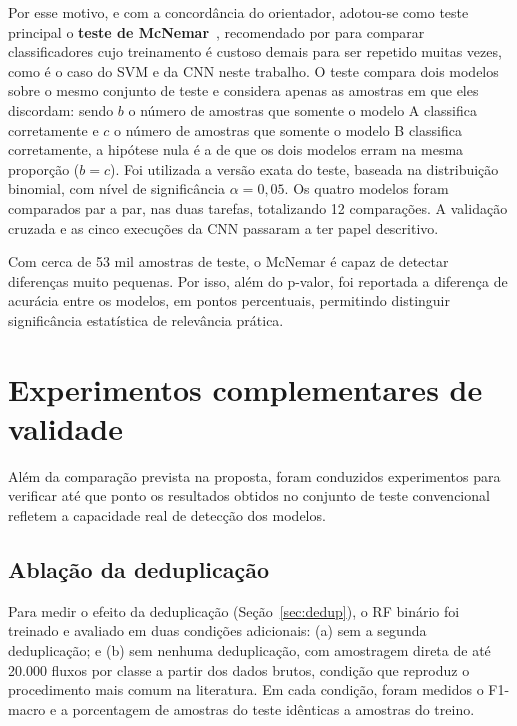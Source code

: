 Por esse motivo, e com a concordância do orientador, adotou-se como teste principal o \textbf{teste de McNemar}~\cite{mcnemar1947}, recomendado por  para comparar classificadores cujo treinamento é custoso demais para ser repetido muitas vezes, como é o caso do SVM e da CNN neste trabalho. O teste compara dois modelos sobre o mesmo conjunto de teste e considera apenas as amostras em que eles discordam: sendo $b$ o número de amostras que somente o modelo A classifica corretamente e $c$ o número de amostras que somente o modelo B classifica corretamente, a hipótese nula é a de que os dois modelos erram na mesma proporção ($b = c$). Foi utilizada a versão exata do teste, baseada na distribuição binomial, com nível de significância $\alpha = 0{,}05$. Os quatro modelos foram comparados par a par, nas duas tarefas, totalizando 12 comparações. A validação cruzada e as cinco execuções da CNN passaram a ter papel descritivo.

Com cerca de 53 mil amostras de teste, o McNemar é capaz de detectar diferenças muito pequenas. Por isso, além do p-valor, foi reportada a diferença de acurácia entre os modelos, em pontos percentuais, permitindo distinguir significância estatística de relevância prática.

\section{Experimentos complementares de validade}
\label{sec:validade}

Além da comparação prevista na proposta, foram conduzidos experimentos para verificar até que ponto os resultados obtidos no conjunto de teste convencional refletem a capacidade real de detecção dos modelos.

\subsection{Ablação da deduplicação}

Para medir o efeito da deduplicação (Seção~\ref{sec:dedup}), o RF binário foi treinado e avaliado em duas condições adicionais: (a) sem a segunda deduplicação; e (b) sem nenhuma deduplicação, com amostragem direta de até 20.000 fluxos por classe a partir dos dados brutos, condição que reproduz o procedimento mais comum na literatura. Em cada condição, foram medidos o F1-macro e a porcentagem de amostras do teste idênticas a amostras do treino.

